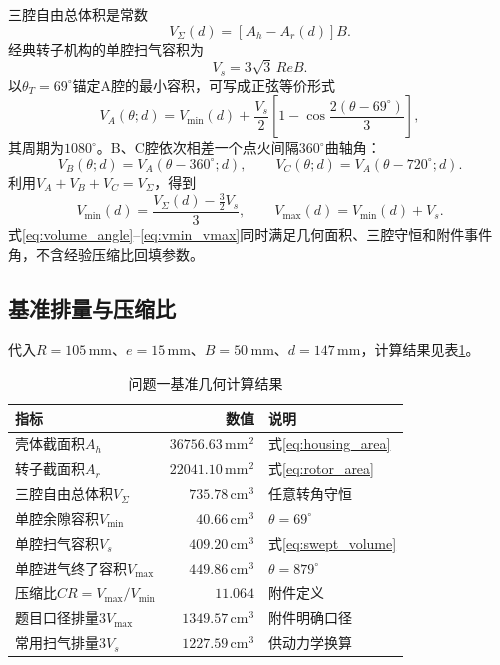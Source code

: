三腔自由总体积是常数
\begin{equation}
 V_\Sigma(d)=[A_h-A_r(d)]B.
 \label{eq:total_free_volume}
\end{equation}
经典转子机构的单腔扫气容积为\cite{yamamoto1981rotary,turner2018wankel}
\begin{equation}
 V_s=3\sqrt3\,ReB.
 \label{eq:swept_volume}
\end{equation}
以$\theta_T=69^\circ$锚定A腔的最小容积，可写成正弦等价形式
\begin{equation}
 V_A(\theta;d)=V_{\min}(d)+\frac{V_s}{2}
 \left[1-\cos\frac{2(\theta-69^\circ)}{3}\right],
 \label{eq:volume_angle}
\end{equation}
其周期为$1080^\circ$。B、C腔依次相差一个点火间隔$360^\circ$曲轴角：
\begin{equation}
 V_B(\theta;d)=V_A(\theta-360^\circ;d),\qquad
 V_C(\theta;d)=V_A(\theta-720^\circ;d).
 \label{eq:phase_volume}
\end{equation}
利用$V_A+V_B+V_C=V_\Sigma$，得到
\begin{equation}
 V_{\min}(d)=\frac{V_\Sigma(d)-\tfrac32V_s}{3},\qquad
 V_{\max}(d)=V_{\min}(d)+V_s.
 \label{eq:vmin_vmax}
\end{equation}
式\eqref{eq:volume_angle}--\eqref{eq:vmin_vmax}同时满足几何面积、三腔守恒和附件事件角，不含经验压缩比回填参数。

\subsection{基准排量与压缩比}

代入$R=105\,\mathrm{mm}$、$e=15\,\mathrm{mm}$、$B=50\,\mathrm{mm}$、$d=147\,\mathrm{mm}$，计算结果见表\ref{tab:q1_corrected}。

\begin{table}[H]
\centering
\caption{问题一基准几何计算结果}
\label{tab:q1_corrected}
\begin{tabular}{lrl}
\toprule
指标 & 数值 & 说明\\
\midrule
壳体截面积$A_h$ & $36756.63\,\mathrm{mm^2}$ & 式\eqref{eq:housing_area}\\
转子截面积$A_r$ & $22041.10\,\mathrm{mm^2}$ & 式\eqref{eq:rotor_area}\\
三腔自由总体积$V_\Sigma$ & $735.78\,\mathrm{cm^3}$ & 任意转角守恒\\
单腔余隙容积$V_{\min}$ & $40.66\,\mathrm{cm^3}$ & $\theta=69^\circ$\\
单腔扫气容积$V_s$ & $409.20\,\mathrm{cm^3}$ & 式\eqref{eq:swept_volume}\\
单腔进气终了容积$V_{\max}$ & $449.86\,\mathrm{cm^3}$ & $\theta=879^\circ$\\
压缩比$CR=V_{\max}/V_{\min}$ & $11.064$ & 附件定义\\
题目口径排量$3V_{\max}$ & $1349.57\,\mathrm{cm^3}$ & 附件明确口径\\
常用扫气排量$3V_s$ & $1227.59\,\mathrm{cm^3}$ & 供动力学换算\\
\bottomrule
\end{tabular}
\end{table}


